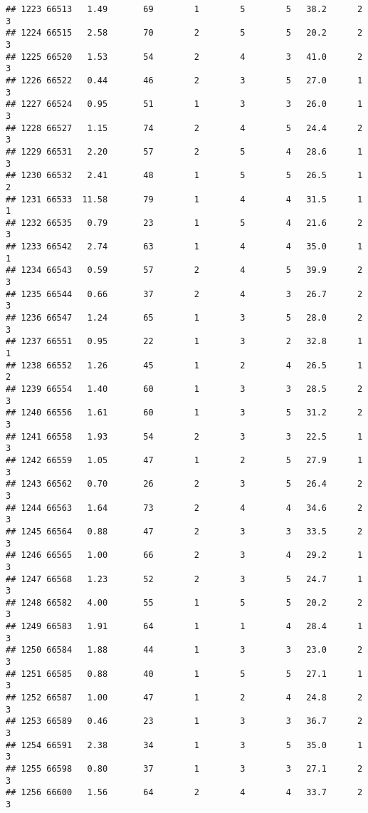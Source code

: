 \documentclass[
]{article}
\begin{document}
\begin{verbatim}
## 1223 66513   1.49       69        1        5        5   38.2      2      3
## 1224 66515   2.58       70        2        5        5   20.2      2      3
## 1225 66520   1.53       54        2        4        3   41.0      2      3
## 1226 66522   0.44       46        2        3        5   27.0      1      3
## 1227 66524   0.95       51        1        3        3   26.0      1      3
## 1228 66527   1.15       74        2        4        5   24.4      2      3
## 1229 66531   2.20       57        2        5        4   28.6      1      3
## 1230 66532   2.41       48        1        5        5   26.5      1      2
## 1231 66533  11.58       79        1        4        4   31.5      1      1
## 1232 66535   0.79       23        1        5        4   21.6      2      3
## 1233 66542   2.74       63        1        4        4   35.0      1      1
## 1234 66543   0.59       57        2        4        5   39.9      2      3
## 1235 66544   0.66       37        2        4        3   26.7      2      3
## 1236 66547   1.24       65        1        3        5   28.0      2      3
## 1237 66551   0.95       22        1        3        2   32.8      1      1
## 1238 66552   1.26       45        1        2        4   26.5      1      2
## 1239 66554   1.40       60        1        3        3   28.5      2      3
## 1240 66556   1.61       60        1        3        5   31.2      2      3
## 1241 66558   1.93       54        2        3        3   22.5      1      3
## 1242 66559   1.05       47        1        2        5   27.9      1      3
## 1243 66562   0.70       26        2        3        5   26.4      2      3
## 1244 66563   1.64       73        2        4        4   34.6      2      3
## 1245 66564   0.88       47        2        3        3   33.5      2      3
## 1246 66565   1.00       66        2        3        4   29.2      1      3
## 1247 66568   1.23       52        2        3        5   24.7      1      3
## 1248 66582   4.00       55        1        5        5   20.2      2      3
## 1249 66583   1.91       64        1        1        4   28.4      1      3
## 1250 66584   1.88       44        1        3        3   23.0      2      3
## 1251 66585   0.88       40        1        5        5   27.1      1      3
## 1252 66587   1.00       47        1        2        4   24.8      2      3
## 1253 66589   0.46       23        1        3        3   36.7      2      3
## 1254 66591   2.38       34        1        3        5   35.0      1      3
## 1255 66598   0.80       37        1        3        3   27.1      2      3
## 1256 66600   1.56       64        2        4        4   33.7      2      3

\end{verbatim}
\end{document}

